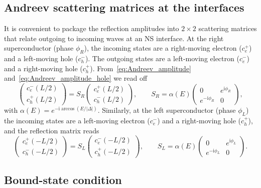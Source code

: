 \documentclass[11pt,a4paper,twoside,openany]{report}
\begin{document}
\subsection{Andreev scattering matrices at the interfaces}

It is convenient to package the reflection amplitudes into $2\times2$ scattering matrices that relate outgoing to incoming waves at an NS interface.  At the right superconductor (phase $\phi_R$), the incoming states are a right-moving electron ($c_e^+$) and a left-moving hole ($c_h^-$).  The outgoing states are a left-moving electron ($c_e^-$) and a right-moving hole ($c_h^+$).  From~\eqref{eq:Andreev_amplitude} and~\eqref{eq:Andreev_amplitude_hole} we read off
\begin{equation}
  \begin{pmatrix} c_e^-(L/2) \\ c_h^+(L/2) \end{pmatrix}
  = S_R \begin{pmatrix} c_e^+(L/2) \\ c_h^-(L/2) \end{pmatrix}, \qquad
  S_R = \alpha(E) \begin{pmatrix} 0 & e^{\mathrm{i}\phi_R} \\ e^{-\mathrm{i}\phi_R} & 0 \end{pmatrix},
  \label{eq:S_R}
\end{equation}
with $\alpha(E) = e^{-\mathrm{i}\arccos(E/|\Delta|)}$.  Similarly, at the left superconductor (phase $\phi_L$) the incoming states are a left-moving electron ($c_e^-$) and a right-moving hole ($c_h^+$), and the reflection matrix reads
\begin{equation}
  \begin{pmatrix} c_e^+(-L/2) \\ c_h^-(-L/2) \end{pmatrix}
  = S_L \begin{pmatrix} c_e^-(-L/2) \\ c_h^+(-L/2) \end{pmatrix}, \qquad
  S_L = \alpha(E) \begin{pmatrix} 0 & e^{\mathrm{i}\phi_L} \\ e^{-\mathrm{i}\phi_L} & 0 \end{pmatrix}.
  \label{eq:S_L}
\end{equation}


\subsection{Bound-state condition}
\end{document}
